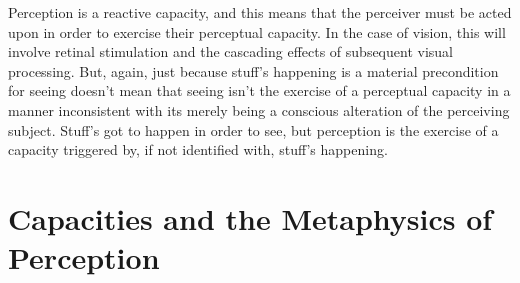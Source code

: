 \documentclass[12pt]{article}
\begin{document}
Perception is a reactive capacity, and this means that the perceiver must be acted upon in order to exercise their perceptual capacity. In the case of vision, this will involve retinal stimulation and the cascading effects of subsequent visual processing. But, again, just because stuff's happening is a material precondition for seeing doesn't mean that seeing isn't the exercise of a perceptual capacity in a manner inconsistent with its merely being a conscious alteration of the perceiving subject. Stuff's got to happen in order to see, but perception is the exercise of a capacity triggered by, if not identified with, stuff's happening.


\section{Capacities and the Metaphysics of Perception} %
\label{sec:capacities_and_the_metaphysics_of_perception}
\end{document}
